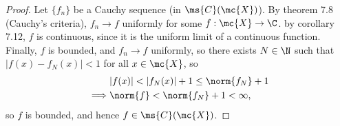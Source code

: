\begin{proof}
	Let \(\{f_n\}\) be a Cauchy sequence (in \(\ms{C}(\mc{X})\)). By theorem 7.8 (Cauchy's criteria), \(f_n\to f\) uniformly for some \(f:\mc{X}\to\C\). by corollary 7.12, \(f\) is continuous, since it is the uniform limit of a continuous function. Finally, \(f\) is bounded, and \(f_n\to f\) uniformly, so there exists \(N\in\N\) such that \(|f(x)-f_N(x)|<1\) for all \(x\in\mc{X}\), so 
	\begin{align*}
		&|f(x)|<|f_N(x)|+1\leq \norm{f_N}+1\\
		\implies&\norm{f}<\norm{f_N}+1<\infty,
	\end{align*}
	so \(f\) is bounded, and hence \(f\in\ms{C}(\mc{X})\).
\end{proof}